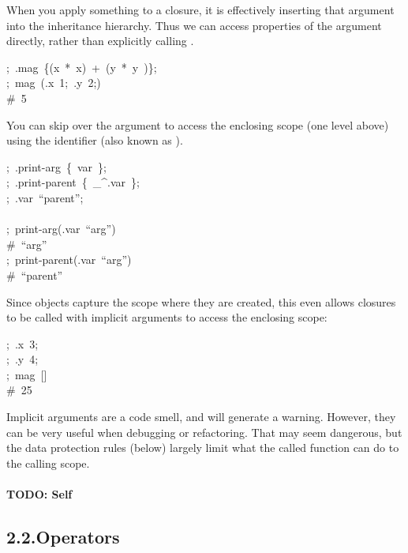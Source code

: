 \documentclass[preprint]{{sigplanconf}}
\begin{document}
When you apply something to a closure, it is effectively inserting that
argument into the inheritance hierarchy.  Thus we can access properties
of the argument directly, rather than explicitly calling \mdcode{\_}.%
\begin{mdpre}%
\noindent;~.mag~\{(x~*~x)~+~(y~*~y~)\};\\
;~mag~(.x~1;~.y~2;)\\
{\#~5}%
\end{mdpre}\noindent{}You can skip over the argument to access the enclosing scope (one level above)
using the \mdcode{\_\textasciicircum{}} identifier (also known as ).
\begin{mdpre}%
\noindent;~.print-arg~\{~var~\};\\
;~.print-parent~\{~\_\textasciicircum{}.var~\};\\
;~.var~“parent”;\\
\\
;~print-arg(.var~“arg”)\\
{\#~“arg”}\\
;~print-parent(.var~“arg”)\\
{\#~“parent”}%
\end{mdpre}\noindent{}Since objects capture the scope where they are created, this even allows
closures to be called with implicit arguments to access the enclosing
scope:
\begin{mdpre}%
\noindent;~.x~3;\\
;~.y~4;\\
;~mag~{}[]\\
{\#~25}%
\end{mdpre}\noindent{}Implicit arguments are a code smell, and will generate a warning.
However, they can be very useful when debugging or refactoring. That may seem
dangerous, but the data protection rules (below) largely limit what the called
function can do to the calling scope.

\paragraph{TODO: Self}\label{sec-todo--self}%

\subsection{2.2.\hspace*{0.5em}Operators}\label{sec-operators}%
\end{document}
